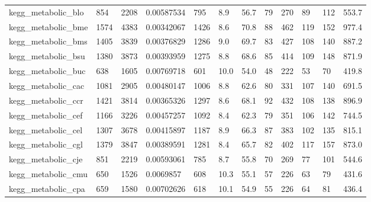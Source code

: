 \begin{longtable}{llllllllllll}
 kegg\_metabolic\_blo                                 & 854        & 2208      & 0.00587534  & 795   & 8.9    & 56.7   & 79    & 270    & 89     & 112    & 553.7   \\
 kegg\_metabolic\_bme                                 & 1574       & 4383      & 0.00342067  & 1426  & 8.6    & 70.8   & 88    & 462    & 119    & 152    & 977.4   \\
 kegg\_metabolic\_bms                                 & 1405       & 3839      & 0.00376829  & 1286  & 9.0    & 69.7   & 83    & 427    & 108    & 140    & 887.2   \\
 kegg\_metabolic\_bsu                                 & 1380       & 3873      & 0.00393959  & 1275  & 8.8    & 68.6   & 85    & 414    & 109    & 148    & 871.9   \\
 kegg\_metabolic\_buc                                 & 638        & 1605      & 0.00769718  & 601   & 10.0   & 54.0   & 48    & 222    & 53     & 70     & 419.8   \\
 kegg\_metabolic\_cac                                 & 1081       & 2905      & 0.00480147  & 1006  & 8.8    & 62.6   & 80    & 331    & 107    & 140    & 691.5   \\
 kegg\_metabolic\_ccr                                 & 1421       & 3814      & 0.00365326  & 1297  & 8.6    & 68.1   & 92    & 432    & 108    & 138    & 896.9   \\
 kegg\_metabolic\_cef                                 & 1166       & 3226      & 0.00457257  & 1092  & 8.4    & 62.3   & 79    & 351    & 106    & 142    & 744.5   \\
 kegg\_metabolic\_cel                                 & 1307       & 3678      & 0.00415897  & 1187  & 8.9    & 66.3   & 87    & 383    & 102    & 135    & 815.1   \\
 kegg\_metabolic\_cgl                                 & 1379       & 3847      & 0.00389591  & 1281  & 8.4    & 65.7   & 82    & 402    & 117    & 157    & 873.0   \\
 kegg\_metabolic\_cje                                 & 851        & 2219      & 0.00593061  & 785   & 8.7    & 55.8   & 70    & 269    & 77     & 101    & 544.6   \\
 kegg\_metabolic\_cmu                                 & 650        & 1526      & 0.0069857   & 608   & 10.3   & 55.1   & 57    & 226    & 63     & 79     & 431.6   \\
 kegg\_metabolic\_cpa                                 & 659        & 1580      & 0.00702626  & 618   & 10.1   & 54.9   & 55    & 226    & 64     & 81     & 436.4   \\

\end{longtable}
